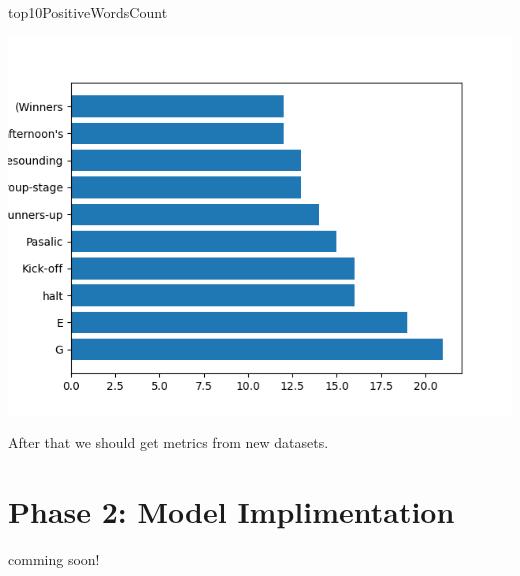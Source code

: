 \documentclass{article}
\begin{document}
top10PositiveWordsCount
\begin{center}
    \includegraphics{top10PositiveWordsCount}
\end{center}

After that we should get metrics from new datasets. 
\section{Phase 2: Model Implimentation}
comming soon!
\end{document}
